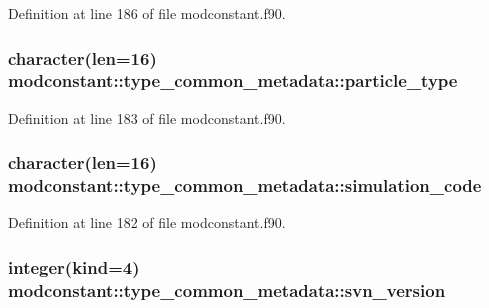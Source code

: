 Definition at line 186 of file modconstant.\-f90.

\hypertarget{structmodconstant_1_1type__common__metadata_a3a269529664935329ee2645f0b0378ba}{
\subsubsection[{particle\-\_\-type}]{\setlength{\rightskip}{0pt plus 5cm}character(len=16) modconstant\-::type\-\_\-common\-\_\-metadata\-::particle\-\_\-type}}\label{structmodconstant_1_1type__common__metadata_a3a269529664935329ee2645f0b0378ba}


Definition at line 183 of file modconstant.\-f90.

\hypertarget{structmodconstant_1_1type__common__metadata_ac2742a0b43801244b3e434212af677c8}{
\subsubsection[{simulation\-\_\-code}]{\setlength{\rightskip}{0pt plus 5cm}character(len=16) modconstant\-::type\-\_\-common\-\_\-metadata\-::simulation\-\_\-code}}\label{structmodconstant_1_1type__common__metadata_ac2742a0b43801244b3e434212af677c8}


Definition at line 182 of file modconstant.\-f90.

\hypertarget{structmodconstant_1_1type__common__metadata_a3391b8fc33aca9c2335c91ddfd1ab62c}{
\subsubsection[{svn\-\_\-version}]{\setlength{\rightskip}{0pt plus 5cm}integer(kind=4) modconstant\-::type\-\_\-common\-\_\-metadata\-::svn\-\_\-version}}\label{structmodconstant_1_1type__common__metadata_a3391b8fc33aca9c2335c91ddfd1ab62c}


